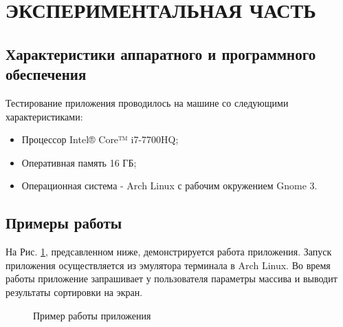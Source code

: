 \documentclass[a4paper,12pt]{article}
\begin{document}
\newpage
\section{ЭКСПЕРИМЕНТАЛЬНАЯ ЧАСТЬ}
\subsection{Характеристики аппаратного и программного обеспечения}
Тестирование приложения проводилось на машине со следующими характеристиками:\\
\begin{itemize}
\item Процессор Intel® Core™ i7-7700HQ;
\item Оперативная память 16 ГБ;
\item Операционная система - Arch Linux с рабочим окружением Gnome 3.
\end{itemize}

\newpage
\subsection{Примеры работы}
На Рис. \ref{images:example}, предсавленном ниже, демонстрируется работа приложения. Запуск приложения осуществляется из эмулятора терминала в Arch Linux. Во время работы приложение запрашивает у пользователя параметры массива и выводит результаты сортировки на экран.
\begin{figure}[h]
\caption{Пример работы приложения}
\label{images:example}
\end{figure}

\newpage
\end{document}
